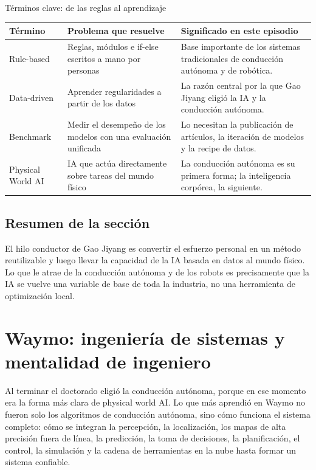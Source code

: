 \documentclass[a4paper]{article}
\begin{document}
\begin{knowledgebox}{Términos clave: de las reglas al aprendizaje}
\begin{tabularx}{\textwidth}{p{}p{}X}
\toprule
Término & Problema que resuelve & Significado en este episodio \\
\midrule
Rule-based & Reglas, módulos e if-else escritos a mano por personas & Base importante de los sistemas tradicionales de conducción autónoma y de robótica. \\
Data-driven & Aprender regularidades a partir de los datos & La razón central por la que Gao Jiyang eligió la IA y la conducción autónoma. \\
Benchmark & Medir el desempeño de los modelos con una evaluación unificada & Lo necesitan la publicación de artículos, la iteración de modelos y la recipe de datos. \\
Physical World AI & IA que actúa directamente sobre tareas del mundo físico & La conducción autónoma es su primera forma; la inteligencia corpórea, la siguiente. \\
\bottomrule
\end{tabularx}
\end{knowledgebox}

\subsection{Resumen de la sección}

El hilo conductor de Gao Jiyang es convertir el esfuerzo personal en un método reutilizable y luego llevar la capacidad de la IA basada en datos al mundo físico. Lo que le atrae de la conducción autónoma y de los robots es precisamente que la IA se vuelve una variable de base de toda la industria, no una herramienta de optimización local.
\section{Waymo: ingeniería de sistemas y mentalidad de ingeniero}

Al terminar el doctorado eligió la conducción autónoma, porque en ese momento era la forma más clara de physical world AI. Lo que más aprendió en Waymo no fueron solo los algoritmos de conducción autónoma, sino cómo funciona el sistema completo: cómo se integran la percepción, la localización, los mapas de alta precisión fuera de línea, la predicción, la toma de decisiones, la planificación, el control, la simulación y la cadena de herramientas en la nube hasta formar un sistema confiable.
\end{document}
